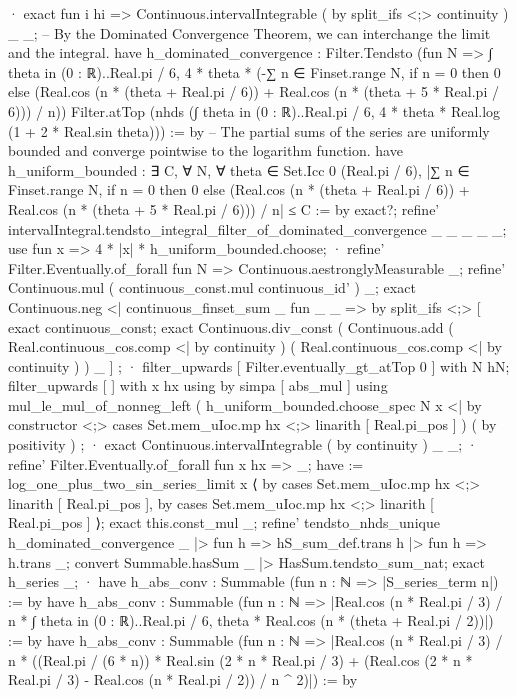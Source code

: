     · exact fun i hi => Continuous.intervalIntegrable ( by split_ifs <;> continuity ) _ _;
  -- By the Dominated Convergence Theorem, we can interchange the limit and the integral.
  have h_dominated_convergence : Filter.Tendsto (fun N => ∫ theta in (0 : ℝ)..Real.pi / 6, 4 * theta * (-∑ n ∈ Finset.range N, if n = 0 then 0 else (Real.cos (n * (theta + Real.pi / 6)) + Real.cos (n * (theta + 5 * Real.pi / 6))) / n)) Filter.atTop (nhds (∫ theta in (0 : ℝ)..Real.pi / 6, 4 * theta * Real.log (1 + 2 * Real.sin theta))) := by
    -- The partial sums of the series are uniformly bounded and converge pointwise to the logarithm function.
    have h_uniform_bounded : ∃ C, ∀ N, ∀ theta ∈ Set.Icc 0 (Real.pi / 6), |∑ n ∈ Finset.range N, if n = 0 then 0 else (Real.cos (n * (theta + Real.pi / 6)) + Real.cos (n * (theta + 5 * Real.pi / 6))) / n| ≤ C := by
      exact?;
    refine' intervalIntegral.tendsto_integral_filter_of_dominated_convergence _ _ _ _ _;
    use fun x => 4 * |x| * h_uniform_bounded.choose;
    · refine' Filter.Eventually.of_forall fun N => Continuous.aestronglyMeasurable _;
      refine' Continuous.mul ( continuous_const.mul continuous_id' ) _;
      exact Continuous.neg <| continuous_finset_sum _ fun _ _ => by split_ifs <;> [ exact continuous_const; exact Continuous.div_const ( Continuous.add ( Real.continuous_cos.comp <| by continuity ) ( Real.continuous_cos.comp <| by continuity ) ) _ ] ;
    · filter_upwards [ Filter.eventually_gt_atTop 0 ] with N hN;
      filter_upwards [ ] with x hx using by simpa [ abs_mul ] using mul_le_mul_of_nonneg_left ( h_uniform_bounded.choose_spec N x <| by constructor <;> cases Set.mem_uIoc.mp hx <;> linarith [ Real.pi_pos ] ) ( by positivity ) ;
    · exact Continuous.intervalIntegrable ( by continuity ) _ _;
    · refine' Filter.Eventually.of_forall fun x hx => _;
      have := log_one_plus_two_sin_series_limit x ⟨ by cases Set.mem_uIoc.mp hx <;> linarith [ Real.pi_pos ], by cases Set.mem_uIoc.mp hx <;> linarith [ Real.pi_pos ] ⟩;
      exact this.const_mul _;
  refine' tendsto_nhds_unique h_dominated_convergence _ |> fun h => hS_sum_def.trans h |> fun h => h.trans _;
  convert Summable.hasSum _ |> HasSum.tendsto_sum_nat;
  exact h_series _;
  · have h_abs_conv : Summable (fun n : ℕ => |S_series_term n|) := by
      have h_abs_conv : Summable (fun n : ℕ => |Real.cos (n * Real.pi / 3) / n * ∫ theta in (0 : ℝ)..Real.pi / 6, theta * Real.cos (n * (theta + Real.pi / 2))|) := by
        have h_abs_conv : Summable (fun n : ℕ => |Real.cos (n * Real.pi / 3) / n * ((Real.pi / (6 * n)) * Real.sin (2 * n * Real.pi / 3) + (Real.cos (2 * n * Real.pi / 3) - Real.cos (n * Real.pi / 2)) / n ^ 2)|) := by
